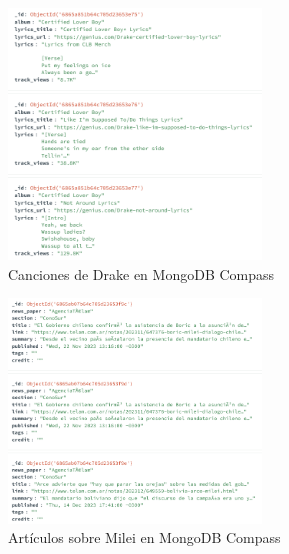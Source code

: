 \begin{figure}[H]
    \centering
    \includegraphics[width=0.6\textwidth]{./insercion_drake.png}
    \caption{Canciones de Drake en MongoDB Compass}\label{fig:inserciondrake}
\end{figure}

\begin{figure}[H]
    \centering
    \includegraphics[width=0.6\textwidth]{./insercion_milei.png}
    \caption{Artículos sobre Milei en MongoDB Compass}\label{fig:insercionmilei}
\end{figure}